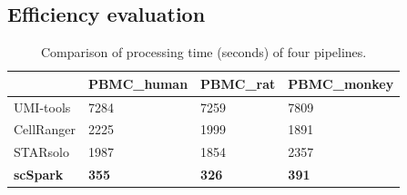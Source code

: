 \documentclass[conference]{IEEEtran}
\begin{document}
\subsection{Efficiency evaluation}

\begin{table}
	\centering
	\caption{Comparison of processing time (seconds) of four pipelines.}\label{tab1}
	\begin{tabular}{l | l | l | l }
		\hline
		 & PBMC\_human & PBMC\_rat & PBMC\_monkey \\ 
		\hline
		UMI-tools & 7284 & 7259 & 7809 \\
		CellRanger & 2225 & 1999 & 1891 \\
		STARsolo & 1987 & 1854 & 2357 \\
		\textbf{scSpark} & \textbf{355} & \textbf{326} & \textbf{391} \\
		\hline
	\end{tabular}
\end{table}
\end{document}
